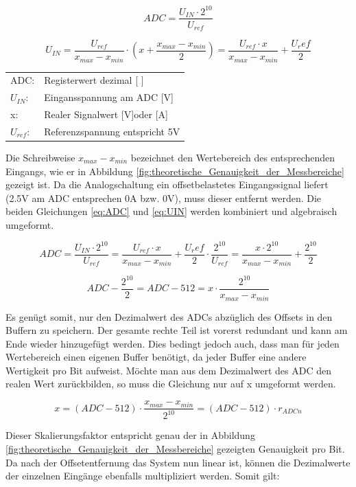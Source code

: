 \begin{equation}
ADC=\frac{U_{IN} \cdot 2^{10}}{U_{ref}}
\label{eq:ADC}
\end{equation}

\begin{equation}
U_{IN} =\frac{U_{ref}}{x_{max} - x_{min}} \cdot \left( x + \frac{x_{max} - x_{min}}{2} \right) = \frac{U_{ref} \cdot x}{x_{max} - x_{min}}+\frac{U_ref}{2}
\label{eq:UIN}
\end{equation}

\begin{table}[H]
\begin{tabular}{ll}
ADC:		&  Registerwert dezimal [ ]\\
$U_{IN}$:	&  Eingansspannung am ADC [V]\\
x:			&  Realer Signalwert [V]oder [A]\\
$U_{ref}$:	&  Referenzspannung entspricht 5V\\
\end{tabular}
\end{table}

Die Schreibweise $x_{max}-x_{min}$ bezeichnet den Wertebereich des entsprechenden Eingangs, wie er in Abbildung \ref{fig:theoretische_Genauigkeit_der_Messbereiche} gezeigt ist. Da die Analogschaltung ein offsetbelastetes Eingangssignal liefert (2.5V am ADC entsprechen 0A bzw. 0V), muss dieser entfernt werden. Die beiden Gleichungen \ref{eq:ADC} und \ref{eq:UIN} werden kombiniert und algebraisch umgeformt.

$$ ADC=\frac{U_{IN} \cdot 2^{10}}{U_{ref}}=\frac{U_{ref} \cdot x}{x_{max} - x_{min}}+\frac{U_ref}{2} \cdot \frac{ 2^{10}}{U_{ref}}=\frac{x \cdot 2^{10}}{x_{max} - x_{min}}+\frac{2^{10}}{2}$$

$$ADC-\frac{2^{10}}{2}=ADC-512=x \cdot \frac{2^{10}}{x_{max} - x_{min}}$$

Es genügt somit, nur den Dezimalwert des ADCs abzüglich des Offsets in den Buffern zu speichern. Der gesamte rechte Teil ist vorerst redundant und kann am Ende wieder hinzugefügt werden. Dies bedingt jedoch auch, dass man für jeden Wertebereich einen eigenen Buffer benötigt, da jeder Buffer eine andere Wertigkeit pro Bit aufweist. Möchte man aus dem Dezimalwert des ADC den realen Wert zurückbilden, so muss die Gleichung nur auf x umgeformt werden.

$$x=(ADC-512)\cdot \frac{x_{max} - x_{min}}{2^{10}}=(ADC-512)\cdot r_{ADCn}$$

Dieser Skalierungsfaktor entspricht genau der in Abbildung \ref{fig:theoretische_Genauigkeit_der_Messbereiche} gezeigten Genauigkeit pro Bit. Da nach der Offsetentfernung das System nun linear ist, können die Dezimalwerte der einzelnen Eingänge ebenfalls multipliziert werden. Somit gilt:

